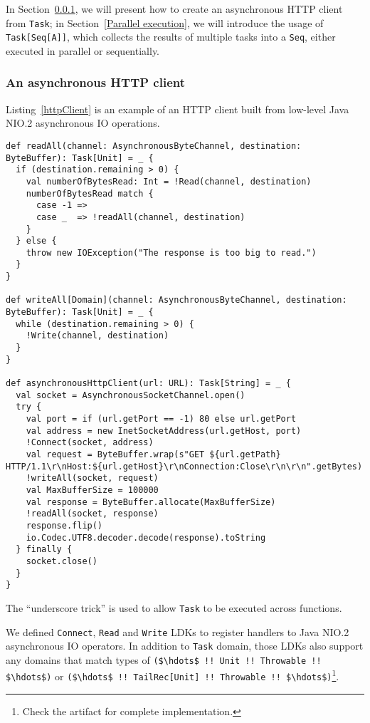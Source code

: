 In Section~\ref{An asynchronous HTTP client}, we will present how to create an asynchronous HTTP client from \lstinline{Task}; in  Section~\ref{Parallel execution}, we will introduce the usage of \lstinline{Task[Seq[A]]}, which collects the results of multiple tasks into a \lstinline{Seq}, either executed in parallel or sequentially.

\subsubsection{An asynchronous HTTP client}\label{An asynchronous HTTP client}

Listing~\ref{httpClient} is an example of an HTTP client built from low-level Java NIO.2 asynchronous IO operations.

\begin{lstlisting}[caption={An asynchronous HTTP client},label={httpClient}]
def readAll(channel: AsynchronousByteChannel, destination: ByteBuffer): Task[Unit] = _ {
  if (destination.remaining > 0) {
    val numberOfBytesRead: Int = !Read(channel, destination)
    numberOfBytesRead match {
      case -1 =>
      case _  => !readAll(channel, destination)
    }
  } else {
    throw new IOException("The response is too big to read.")
  }
}

def writeAll[Domain](channel: AsynchronousByteChannel, destination: ByteBuffer): Task[Unit] = _ {
  while (destination.remaining > 0) {
    !Write(channel, destination)
  }
}

def asynchronousHttpClient(url: URL): Task[String] = _ {
  val socket = AsynchronousSocketChannel.open()
  try {
    val port = if (url.getPort == -1) 80 else url.getPort
    val address = new InetSocketAddress(url.getHost, port)
    !Connect(socket, address)
    val request = ByteBuffer.wrap(s"GET ${url.getPath} HTTP/1.1\r\nHost:${url.getHost}\r\nConnection:Close\r\n\r\n".getBytes)
    !writeAll(socket, request)
    val MaxBufferSize = 100000
    val response = ByteBuffer.allocate(MaxBufferSize)
    !readAll(socket, response)
    response.flip()
    io.Codec.UTF8.decoder.decode(response).toString
  } finally {
    socket.close()
  }
}
\end{lstlisting}

The ``underscore trick'' is used to allow \lstinline{Task} to be executed across functions.

We defined \lstinline{Connect}, \lstinline{Read} and \lstinline{Write} LDKs to register handlers to Java NIO.2 asynchronous IO operators. In addition to \lstinline{Task} domain, those LDKs also support any domains that match types of \lstinline[mathescape=true]{($\hdots$ !! Unit !! Throwable !! $\hdots$)} or \lstinline[mathescape=true]{($\hdots$ !! TailRec[Unit] !! Throwable !! $\hdots$)}\footnote{Check the artifact for complete implementation.}.

